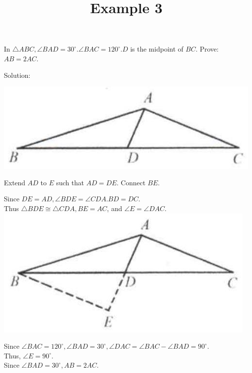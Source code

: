 \documentclass{article}
\title{Example 3}
\date{}
\begin{document}
\maketitle

In \(\triangle A B C, \angle B A D=30^{\circ} . \angle B A C=120^{\circ} . D\) is the midpoint of \(B C\). Prove: \(A B=2 A C\).

Solution:
\begin{center}
\includegraphics[width=\textwidth]{images/problem_image_1.jpg}
\end{center}

Extend \(A D\) to \(E\) such that \(A D=D E\). Connect \(B E\).

Since \(D E=A D, \angle B D E=\angle C D A . B D=D C\).\\
Thus \(\triangle B D E \cong \triangle C D A, B E=A C\), and \(\angle E=\angle D A C\).\\
\centering
\includegraphics[width=\textwidth]{images/reasoning_image_1.jpg}

Since \(\angle B A C=120^{\circ}, \angle B A D=30^{\circ}, \angle D A C=\angle B A C-\angle B A D=90^{\circ}\).\\
Thus, \(\angle E=90^{\circ}\).\\
Since \(\angle B A D=30^{\circ}, A B=2 A C\).
\end{document}
